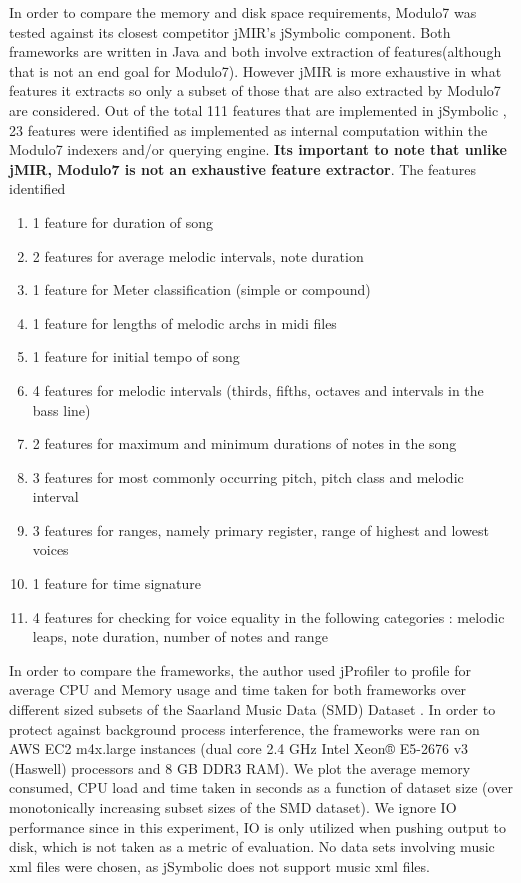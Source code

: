 \noindent In order to compare the memory and disk space requirements, Modulo7 was tested against its closest competitor jMIR's \cite{jMIR} jSymbolic component. Both frameworks are written in Java and both involve extraction of features(although that is not an end goal for Modulo7). However jMIR is more exhaustive in what features it extracts so only a subset of those that are also extracted by Modulo7 are considered. Out of the total 111 features that are implemented in jSymbolic \cite{jSymbolic}, 23 features were identified as implemented as internal computation within the Modulo7 indexers and/or querying engine. \textbf{Its important to note that unlike jMIR, Modulo7 is not an exhaustive feature extractor}. The features identified  
\begin{enumerate}
\item 1 feature for duration of song
\item 2 features for average melodic intervals, note duration
\item 1 feature for Meter classification (simple or compound)
\item 1 feature for lengths of melodic archs in midi files
\item 1 feature for initial tempo of song
\item 4 features for melodic intervals (thirds, fifths, octaves and intervals in the bass line)
\item 2 features for maximum and minimum durations of notes in the song
\item 3 features for most commonly occurring pitch, pitch class and melodic interval
\item 3 features for ranges, namely primary register, range of highest and lowest voices
\item 1 feature for time signature
\item 4 features for checking for voice equality in the following categories : melodic leaps, note duration, number of notes and range
\end{enumerate}
\noindent In order to compare the frameworks, the author used jProfiler to profile for average CPU and Memory usage and time taken for both frameworks over different sized subsets of the Saarland Music Data (SMD) Dataset \cite{saarlandmsd}. In order to protect against background process interference, the frameworks were ran on AWS EC2 m4x.large instances (dual core 2.4 GHz Intel Xeon® E5-2676 v3 (Haswell) processors
and 8 GB DDR3 RAM). We plot the average memory consumed, CPU load and time taken in seconds as a function of dataset size (over monotonically increasing subset sizes of the SMD dataset). We ignore IO performance since in this experiment, IO is only utilized when pushing output to disk, which is not taken as a metric of evaluation. No data sets involving music xml files were chosen, as jSymbolic does not support music xml files. 

